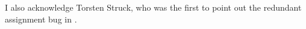 I also acknowledge Torsten Struck, who was the first to point out the redundant
assignment bug in \hamstr.
